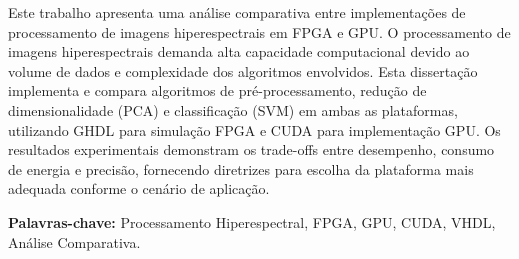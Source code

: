 \documentclass[Portugues,Final]{tese-FT}
\begin{document}
%

\paginasiniciais

 

\ifturnitin
   \relax 
\else


\begin{resumo}
Este trabalho apresenta uma análise comparativa entre implementações de processamento de imagens hiperespectrais em FPGA e GPU. O processamento de imagens hiperespectrais demanda alta capacidade computacional devido ao volume de dados e complexidade dos algoritmos envolvidos. Esta dissertação implementa e compara algoritmos de pré-processamento, redução de dimensionalidade (PCA) e classificação (SVM) em ambas as plataformas, utilizando GHDL para simulação FPGA e CUDA para implementação GPU. Os resultados experimentais demonstram os trade-offs entre desempenho, consumo de energia e precisão, fornecendo diretrizes para escolha da plataforma mais adequada conforme o cenário de aplicação.

\textbf{Palavras-chave:} Processamento Hiperespectral, FPGA, GPU, CUDA, VHDL, Análise Comparativa.
\end{resumo}
\end{document}
